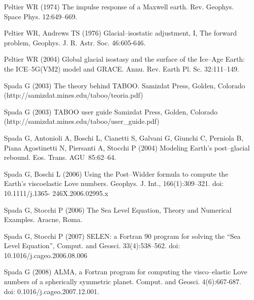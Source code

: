 \documentclass[11pt,fleqn,a4paper,titlepage]{article}
\newcommand\selens{\textsf{SELEN}}
\newcommand\eos{Eos. Trans. AGU~}
\begin{document}
\begin{thebibliography}{99}
Peltier WR (1974) 
The impulse response of a Maxwell earth. 
Rev. Geophys. Space Phys. 12:649--669.  

Peltier WR, Andrews TS (1976)
Glacial--isostatic adjustment, I, The forward problem, 
Geophys. J. R. Astr. Soc. 46:605-646. 


Peltier WR (2004)
Global glacial isostasy and the surface of the Ice--Age Earth: the ICE--5G(VM2) model and GRACE. 
Annu. Rev. Earth Pl. Sc. 32:111--149.  

Spada G (2003) 
The theory behind TABOO. 
Samizdat Press, Golden, Colorado (http://samizdat.mines.edu/taboo/teoria.pdf) 

Spada G (2003) 
TABOO user guide 
Samizdat Press, Golden, Colorado (http://samizdat.mines.edu/taboo/user\_guide.pdf)
  
Spada G, Antonioli A, Boschi L, Cianetti S, Galvani G, Giunchi C, Perniola B, 
  Piana Agostinetti N, Piersanti A, Stocchi P (2004) 
  Modeling Earth's post--glacial rebound.
  \eos  85:62--64.  

Spada G, Boschi L (2006) 
Using the Post--Widder formula to compute the Earth's viscoelastic Love numbers. 
Geophys. J. Int., 166(1):309--321. doi: 10.1111/j.1365- 246X.2006.02995.x

  Spada G, Stocchi P (2006) 
  The Sea Level Equation, Theory and Numerical Examples. 
  Aracne, Roma.
  
  Spada G, Stocchi P (2007) 
  \selens: a Fortran 90 program for solving the ``Sea Level Equation'', 
  Comput. and Geosci. 33(4):538--562. doi: 10.1016/j.cageo.2006.08.006

Spada G (2008) 
ALMA, a Fortran program for computing the visco--elastic Love numbers of a spherically symmetric planet. 
Comput. and Geosci. 4(6):667-687. doi: 0.1016/j.cageo.2007.12.001.


\end{thebibliography}
\end{document}
